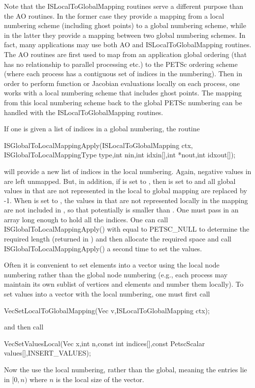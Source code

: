 Note that the ISLocalToGlobalMapping routines serve a different purpose
than the AO routines. In the former case they provide a mapping
from  a local numbering scheme (including ghost points) to a global numbering scheme,
while in the latter they provide a mapping between two global numbering schemes.
In fact, many applications may use both AO and ISLocalToGlobalMapping routines.
The AO routines are first used to map from an application global ordering
(that has no relationship to parallel processing etc.) to the PETSc ordering scheme
(where each process has a contiguous set of indices in the numbering). Then in order
to perform function or Jacobian evaluations locally on each process, one works
with a local numbering scheme that includes ghost points.  The mapping from this local
numbering scheme back to the global PETSc numbering can be handled with the
ISLocalToGlobalMapping routines.

If one is given a list of indices in a global numbering, the routine
\begin{tabbing}
  ISGlobalToLocalMappingApply(ISLocalToGlobalMapping ctx,\\
                              ISGlobalToLocalMappingType type,int nin,int idxin[],int *nout,int idxout[]);
\end{tabbing}
 will provide
a new list of indices in the local numbering. Again, negative values in
 are left unmapped.  But, in addition, if  is set to
,
then  is set to  and all global values
in  that are not represented in the local to global mapping
are replaced by -1. When  is set to ,
 the values in  that are not
represented locally in the mapping are not included in , so that
potentially  is smaller than .  One must
pass in an array long enough to hold all the indices. One can call
ISGlobalToLocalMappingApply() with  equal to
PETSC\_NULL to determine the required length (returned in
) and then allocate the required space and call
ISGlobalToLocalMappingApply() a second time to set the values.

Often it is convenient to set elements into a vector using the local node
numbering rather than the global node numbering (e.g.,  each process may
maintain its own sublist of vertices and elements and number them locally).
To set values into a vector with the local numbering, one must first call
\begin{tabbing}
  VecSetLocalToGlobalMapping(Vec v,ISLocalToGlobalMapping ctx);
\end{tabbing}
and then call
\begin{tabbing}
  VecSetValuesLocal(Vec x,int n,const int indices[],const PetscScalar values[],INSERT\_VALUES);
\end{tabbing}
Now the  use the local numbering, rather than the global, meaning
the entries lie in $[0,n)$ where $n$ is the local size of the vector.

